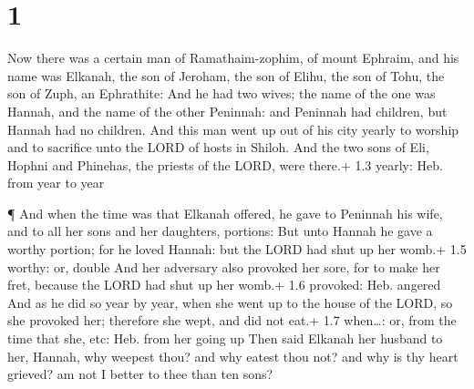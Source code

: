 \hypertarget{section}{%
\section{1}\label{section}}

 Now there was a certain man of Ramathaim-zophim, of mount
Ephraim, and his name was Elkanah, the son of Jeroham, the son of Elihu,
the son of Tohu, the son of Zuph, an Ephrathite:  And he had
two wives; the name of the one was Hannah, and the name of the other
Peninnah: and Peninnah had children, but Hannah had no children.
 And this man went up out of his city yearly to worship and
to sacrifice unto the LORD of hosts in Shiloh. And the two sons of Eli,
Hophni and Phinehas, the priests of the LORD, were there.+ 1.3 yearly:
Heb. from year to year

 ¶ And when the time was that Elkanah offered, he gave to
Peninnah his wife, and to all her sons and her daughters, portions:
 But unto Hannah he gave a worthy portion; for he loved
Hannah: but the LORD had shut up her womb.+ 1.5 worthy: or, double
 And her adversary also provoked her sore, for to make her
fret, because the LORD had shut up her womb.+ 1.6 provoked: Heb. angered
 And as he did so year by year, when she went up to the
house of the LORD, so she provoked her; therefore she wept, and did not
eat.+ 1.7 when\ldots: or, from the time that she, etc: Heb. from her
going up  Then said Elkanah her husband to her, Hannah, why
weepest thou? and why eatest thou not? and why is thy heart grieved? am
not I better to thee than ten sons?

